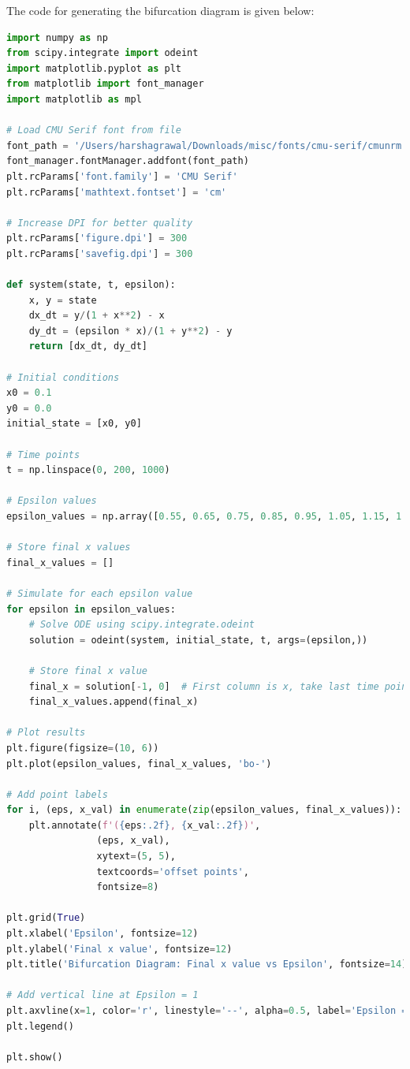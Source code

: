 \documentclass[12pt]{article}
\begin{document}
The code for generating the bifurcation diagram is given below:
\begin{lstlisting}[language=Python, caption=Bifurcation simulation]
import numpy as np
from scipy.integrate import odeint
import matplotlib.pyplot as plt
from matplotlib import font_manager
import matplotlib as mpl

# Load CMU Serif font from file
font_path = '/Users/harshagrawal/Downloads/misc/fonts/cmu-serif/cmunrm.ttf'
font_manager.fontManager.addfont(font_path)
plt.rcParams['font.family'] = 'CMU Serif'
plt.rcParams['mathtext.fontset'] = 'cm'

# Increase DPI for better quality
plt.rcParams['figure.dpi'] = 300
plt.rcParams['savefig.dpi'] = 300

def system(state, t, epsilon):
    x, y = state
    dx_dt = y/(1 + x**2) - x
    dy_dt = (epsilon * x)/(1 + y**2) - y
    return [dx_dt, dy_dt]

# Initial conditions
x0 = 0.1
y0 = 0.0
initial_state = [x0, y0]

# Time points
t = np.linspace(0, 200, 1000)

# Epsilon values
epsilon_values = np.array([0.55, 0.65, 0.75, 0.85, 0.95, 1.05, 1.15, 1.25, 1.35, 1.45])

# Store final x values
final_x_values = []

# Simulate for each epsilon value
for epsilon in epsilon_values:
    # Solve ODE using scipy.integrate.odeint
    solution = odeint(system, initial_state, t, args=(epsilon,))
    
    # Store final x value
    final_x = solution[-1, 0]  # First column is x, take last time point
    final_x_values.append(final_x)

# Plot results
plt.figure(figsize=(10, 6))
plt.plot(epsilon_values, final_x_values, 'bo-')

# Add point labels
for i, (eps, x_val) in enumerate(zip(epsilon_values, final_x_values)):
    plt.annotate(f'({eps:.2f}, {x_val:.2f})', 
                (eps, x_val),
                xytext=(5, 5),
                textcoords='offset points',
                fontsize=8)

plt.grid(True)
plt.xlabel('Epsilon', fontsize=12)
plt.ylabel('Final x value', fontsize=12)
plt.title('Bifurcation Diagram: Final x value vs Epsilon', fontsize=14)

# Add vertical line at Epsilon = 1
plt.axvline(x=1, color='r', linestyle='--', alpha=0.5, label='Epsilon = 1')
plt.legend()

plt.show()
\end{lstlisting}
\end{document}
